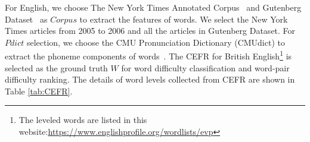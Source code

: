 
For English,  
we choose The New York Times Annotated Corpus~\cite{Evan2008newyork} and Gutenberg Dataset~\cite{lahiri:2014:SRW} as $Corpus$ to extract the features of words.
We select the New York Times articles from 2005 to 2006 and all the articles in Gutenberg Dataset.
For $Pdict$ selection, we choose the CMU Pronunciation Dictionary (CMUdict) to extract the phoneme components of words~\cite{John2004CMU}.
The CEFR for British English\footnote{The leveled words are listed in this website:\url{https://www.englishprofile.org/wordlists/evp}}
is selected as the ground truth $W$ for word difficulty classification and word-pair difficulty ranking. 
The details of word levels collected from CEFR are 
shown in Table \ref{tab:CEFR}.



